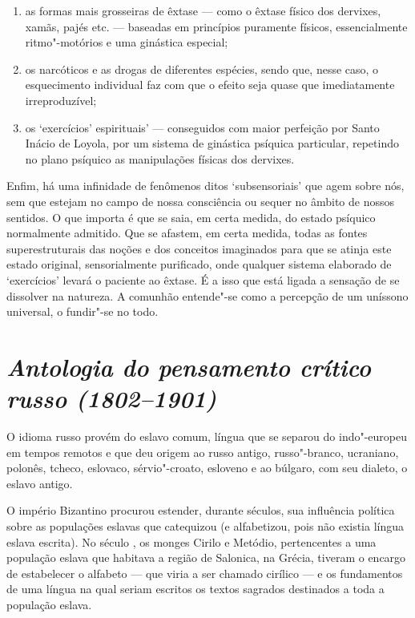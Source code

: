 \begin{enumerate}
\def\labelenumi{\arabic{enumi})}
\item
  as formas mais grosseiras de êxtase --- como o êxtase físico dos
dervixes, xamãs, pajés etc. --- baseadas em princípios puramente físicos,
essencialmente ritmo"-motórios e uma ginástica especial;
\item
  os narcóticos e as drogas de diferentes espécies, sendo que, nesse
caso, o esquecimento individual faz com que o efeito seja quase que
imediatamente irreproduzível;
\item
  os `exercícios' espirituais' --- conseguidos com maior perfeição por
Santo Inácio de Loyola, por um sistema de ginástica psíquica particular,
repetindo no plano psíquico as manipulações físicas dos dervixes.
\end{enumerate}

Enfim, há uma infinidade de fenômenos ditos `subsensoriais' que agem
sobre nós, sem que estejam no campo de nossa consciência ou sequer no
âmbito de nossos sentidos. O que importa é que se saia, em certa medida,
do estado psíquico normalmente admitido. Que se afastem, em certa
medida, todas as fontes superestruturais das noções e dos conceitos
imaginados para que se atinja este estado original, sensorialmente
purificado, onde qualquer sistema elaborado de `exercícios' levará o
paciente ao êxtase. É a isso que está ligada a sensação de se dissolver
na natureza. A comunhão entende"-se como a percepção de um uníssono
universal, o fundir"-se no todo.

\chapter{\emph{Antologia do pensamento crítico russo (1802--1901)}}

O idioma russo provém do eslavo comum, língua que se separou do
indo"-europeu em tempos remotos e que deu origem ao russo antigo,
russo"-branco, ucraniano, polonês, tcheco, eslovaco, sérvio"-croato,
esloveno e ao búlgaro, com seu dialeto, o eslavo antigo.

O império Bizantino procurou estender, durante séculos, sua influência
política sobre as populações eslavas que catequizou (e alfabetizou, pois
não existia língua eslava escrita). No século , os monges Cirilo e
Metódio, pertencentes a uma população eslava que habitava a região de
Salonica, na Grécia, tiveram o encargo de estabelecer o alfabeto --- que
viria a ser chamado cirílico --- e os fundamentos de uma língua na qual
seriam escritos os textos sagrados destinados a toda a população eslava.

